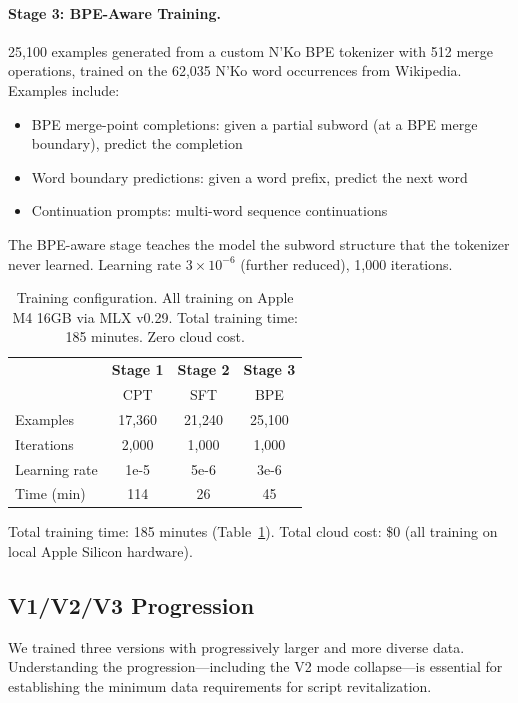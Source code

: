 \documentclass[11pt]{article}
\begin{document}
\paragraph{Stage 3: BPE-Aware Training.}
25,100 examples generated from a custom N'Ko BPE tokenizer with 512 merge operations, trained on the 62,035 N'Ko word occurrences from Wikipedia.
Examples include:
\begin{itemize}
\item BPE merge-point completions: given a partial subword (at a BPE merge boundary), predict the completion
\item Word boundary predictions: given a word prefix, predict the next word
\item Continuation prompts: multi-word sequence continuations
\end{itemize}
The BPE-aware stage teaches the model the subword structure that the tokenizer never learned.
Learning rate $3 \times 10^{-6}$ (further reduced), 1,000 iterations.

\begin{table}[t]
\centering
\small
\begin{tabular}{lccc}
\toprule
& \textbf{Stage 1} & \textbf{Stage 2} & \textbf{Stage 3} \\
& CPT & SFT & BPE \\
\midrule
Examples & 17,360 & 21,240 & 25,100 \\
Iterations & 2,000 & 1,000 & 1,000 \\
Learning rate & 1e-5 & 5e-6 & 3e-6 \\
Time (min) & 114 & 26 & 45 \\
\bottomrule
\end{tabular}
\caption{Training configuration. All training on Apple M4 16GB via MLX v0.29. Total training time: 185 minutes. Zero cloud cost.}
\label{tab:training-config}
\end{table}

Total training time: 185 minutes (Table~\ref{tab:training-config}).
Total cloud cost: \$0 (all training on local Apple Silicon hardware).

\subsection{V1/V2/V3 Progression}

We trained three versions with progressively larger and more diverse data.
Understanding the progression---including the V2 mode collapse---is essential for establishing the minimum data requirements for script revitalization.
\end{document}
